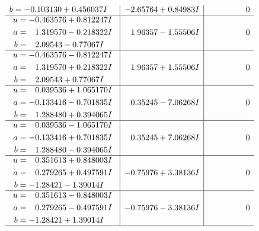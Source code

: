 \documentclass[1p]{elsarticle_modified}
\theoremstyle{definition}
\begin{document}
$$\begin{array}{c|c|c}
\begin{aligned}
b &= -0.103130 + 0.456037 I\end{aligned}
 & -2.65764 + 0.84983 I & \phantom{-0.000000 } 0 \\ \hline\begin{aligned}
u &= -0.463576 + 0.812247 I \\
a &= \phantom{-}1.319570 - 0.218322 I \\
b &= \phantom{-}2.09543 - 0.77067 I\end{aligned}
 & \phantom{-}1.96357 - 1.55506 I & \phantom{-0.000000 } 0 \\ \hline\begin{aligned}
u &= -0.463576 - 0.812247 I \\
a &= \phantom{-}1.319570 + 0.218322 I \\
b &= \phantom{-}2.09543 + 0.77067 I\end{aligned}
 & \phantom{-}1.96357 + 1.55506 I & \phantom{-0.000000 } 0 \\ \hline\begin{aligned}
u &= \phantom{-}0.039536 + 1.065170 I \\
a &= -0.133416 - 0.701835 I \\
b &= \phantom{-}1.288480 + 0.394065 I\end{aligned}
 & \phantom{-}0.35245 - 7.06268 I & \phantom{-0.000000 } 0 \\ \hline\begin{aligned}
u &= \phantom{-}0.039536 - 1.065170 I \\
a &= -0.133416 + 0.701835 I \\
b &= \phantom{-}1.288480 - 0.394065 I\end{aligned}
 & \phantom{-}0.35245 + 7.06268 I & \phantom{-0.000000 } 0 \\ \hline\begin{aligned}
u &= \phantom{-}0.351613 + 0.848003 I \\
a &= \phantom{-}0.279265 + 0.497591 I \\
b &= -1.28421 - 1.39014 I\end{aligned}
 & -0.75976 + 3.38136 I & \phantom{-0.000000 } 0 \\ \hline\begin{aligned}
u &= \phantom{-}0.351613 - 0.848003 I \\
a &= \phantom{-}0.279265 - 0.497591 I \\
b &= -1.28421 + 1.39014 I\end{aligned}
 & -0.75976 - 3.38136 I & \phantom{-0.000000 } 0\\
 \hline 
 \end{array}$$\newpage$$\begin{array}{c|c|c}  

\end{array}$$
\end{document}
